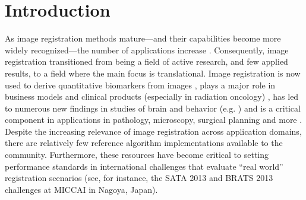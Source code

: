 \documentclass{frontiersSCNS}
\begin{document}
\section{Introduction}
As image registration methods mature---and their capabilities become
more widely recognized---the number of applications increase
\cite{Rueckert1999,2004,Shelton2005,Miller2005,Chen2008,Cheung2009,Baloch2009,Peyrat2010,Metz2011,Kikinis2011,Fedorov2011,Murphy2011}.
Consequently, image registration transitioned from being a field of active research, and few applied results, to a
field where the main focus is translational.  Image registration is
now used to derive quantitative biomarkers from images
\cite{Jack2010a}, plays a major role in business models and clinical
products (especially in radiation oncology) \cite{Cheung2009}, has led
to numerous new findings in studies of brain and behavior (e.g. \cite{Bearden2007}) and is a critical component in applications in
pathology, microscopy, surgical planning and more
\cite{Shelton2005,Miller2005,Floca2007,Chen2008,Cheung2009,Peyrat2010,Kikinis2011,Murphy2011}.
Despite the increasing relevance of image registration across
application domains, there are relatively few reference algorithm
implementations available to the community.  Furthermore, these
resources have become critical to setting performance standards in
international challenges that evaluate ``real world'' registration
scenarios (see, for instance, the SATA 2013 and BRATS 2013 challenges
at MICCAI in Nagoya, Japan). 





\end{document}
